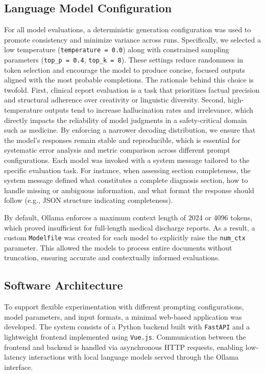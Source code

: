 \subsection{Language Model Configuration}
For all model evaluations, a deterministic generation configuration was used 
to promote consistency and minimize variance across runs. 
Specifically, we selected a low temperature (\texttt{temperature = 0.0}) 
along with constrained sampling parameters (\texttt{top\_p = 0.4},
\texttt{top\_k = 8}). 
These settings reduce randomness in token selection and encourage the 
model to produce concise, focused outputs aligned with the most probable completions.
The rationale behind this choice is twofold. 
First, clinical report evaluation is a task that prioritizes factual precision 
and structural adherence over creativity or linguistic diversity. 
Second, high-temperature outputs tend to increase hallucination rates and irrelevance, 
which directly impacts the reliability of model judgments in a safety-critical 
domain such as medicine.
By enforcing a narrower decoding distribution, we ensure that the model’s responses 
remain stable and reproducible, which is essential for systematic error 
analysis and metric comparison across different prompt configurations.
Each model was invoked with a system message tailored to the specific evaluation task. 
For instance, when assessing section completeness, 
the system message defined what constitutes a complete diagnosis section, 
how to handle missing or ambiguous information, and what format the response 
should follow (e.g., JSON structure indicating completeness).

By default, Ollama enforces a maximum context length of 2024 or 4096 tokens, 
which proved insufficient for full-length medical discharge reports. 
As a result, a custom \texttt{Modelfile} was created for each model to 
explicitly raise the \texttt{num\_ctx} parameter. 
This allowed the models to process entire documents without truncation, 
ensuring accurate and contextually informed evaluations.

\subsection{Software Architecture}
To support flexible experimentation with different prompting configurations, model parameters, and input formats, a minimal web-based application was developed. The system consists of a Python backend built with \texttt{FastAPI} and a lightweight frontend implemented using \texttt{Vue.js}. Communication between the frontend and backend is handled via asynchronous HTTP requests, enabling low-latency interactions with local language models served through the Ollama interface.

